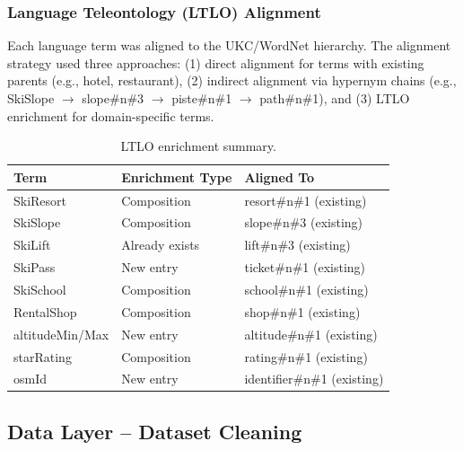 \subsubsection{Language Teleontology (LTLO) Alignment}

Each language term was aligned to the UKC/WordNet hierarchy. The alignment strategy used three approaches: (1) direct alignment for terms with existing parents (e.g., hotel, restaurant), (2) indirect alignment via hypernym chains (e.g., SkiSlope $\rightarrow$ slope\#n\#3 $\rightarrow$ piste\#n\#1 $\rightarrow$ path\#n\#1), and (3) LTLO enrichment for domain-specific terms.

\begin{table}[h!]
\centering
\small
\begin{tabular}{|l|l|l|}
\hline
\textbf{Term} & \textbf{Enrichment Type} & \textbf{Aligned To} \\
\hline
SkiResort & Composition & resort\#n\#1 (existing) \\
SkiSlope & Composition & slope\#n\#3 (existing) \\
SkiLift & Already exists & lift\#n\#3 (existing) \\
SkiPass & New entry & ticket\#n\#1 (existing) \\
SkiSchool & Composition & school\#n\#1 (existing) \\
RentalShop & Composition & shop\#n\#1 (existing) \\
altitudeMin/Max & New entry & altitude\#n\#1 (existing) \\
starRating & Composition & rating\#n\#1 (existing) \\
osmId & New entry & identifier\#n\#1 (existing) \\
\hline
\end{tabular}
\caption{LTLO enrichment summary.}
\end{table}

\subsection{Data Layer -- Dataset Cleaning}

